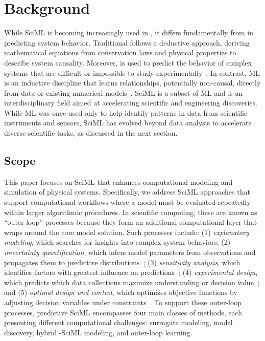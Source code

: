 \section{Background}
\label{sec:background}

While SciML is becoming increasingly used in \CSE{}, it differs fundamentally from \CSE{} in predicting system behavior. Traditional \CSE{} follows a deductive approach, deriving mathematical equations from conservation laws and physical properties to describe system causality.
Moreover, \CSE{} is used to predict the behavior of complex systems that are difficult or impossible to study experimentally~\cite{ruede2018research}.
In contrast, ML is an inductive discipline that learns relationships, potentially non-causal, directly from data or existing numerical models~\cite{Ruden_et_alAIDA_2020}.
SciML is a subset of ML and is an interdisciplinary field aimed at accelerating scientific and engineering discoveries.
While ML was once used only to help identify patterns in data from scientific instruments and sensors, SciML has evolved beyond data analysis to accelerate diverse scientific tasks, as discussed in the next section.

\subsection{Scope}
\label{sec:scope}

This paper focuses on SciML that enhances computational modeling and simulation of physical systems. Specifically, we address SciML approaches that support computational workflows where a model must be evaluated repeatedly within larger algorithmic procedures. In scientific computing, these are known as ``outer-loop'' processes because they form an additional computational layer that wraps around the core model solution. Such processes include:
(1) \emph{explanatory modeling}, which searches for insights into complex system behaviors; (2) \emph{uncertainty quantification}, which infers model parameters from observations and propagates them to predictive distributions~\cite{Ghanem_HO_book_2016}; (3) \emph{sensitivity analysis}, which identifies factors with greatest influence on predictions~\cite{Saltelli_book_2004}; (4) \emph{experimental design}, which predicts which data collections maximize understanding or decision value~\cite{Ryan_DMP_ISR_2016}; and (5) \emph{optimal design and control}, which optimizes objective functions by adjusting decision variables under constraints~\cite[Ch.~1]{Martins_Ning_book_2021}.
To support these outer-loop processes, predictive SciML encompasses four main classes of methods, each presenting different computational challenges: surrogate modeling, model discovery, hybrid \CSE{}-SciML modeling, and outer-loop learning.

